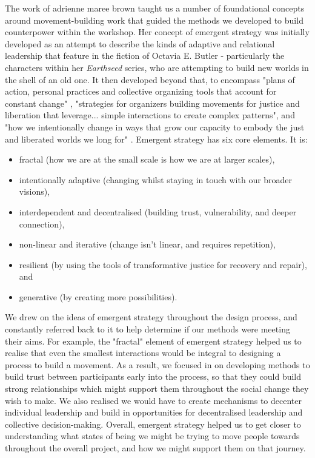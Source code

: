 The work of adrienne maree brown taught us a number of foundational concepts around movement-building work that guided the methods we developed to build counterpower within the workshop. Her concept of emergent strategy was initially developed as an attempt to describe the kinds of adaptive and relational leadership that feature in the fiction of Octavia E. Butler - particularly the characters within her \emph{Earthseed} series, who are attempting to build new worlds in the shell of an old one. It then developed beyond that, to encompass "plans of action, personal practices and collective organizing tools that account for constant change" \citep[p. 23]{brown_emergent_2017}, "strategies for organizers building movements for justice and liberation that leverage... simple interactions to create complex patterns", and "how we intentionally change in ways that grow our capacity to embody the just and liberated worlds we long for" \citep[p. 24]{brown_emergent_2017}. Emergent strategy has six core elements. It is:
\begin{itemize}
    \item fractal (how we are at the small scale is how we are at larger scales),
    \item intentionally adaptive (changing whilst staying in touch with our broader visions),
    \item interdependent and decentralised (building trust, vulnerability, and deeper connection),
    \item non-linear and iterative (change isn't linear, and requires repetition),
    \item resilient (by using the tools of transformative justice for recovery and repair), and
    \item generative (by creating more possibilities). \cite[p. 50]{brown_emergent_2017}
\end{itemize}
We drew on the ideas of emergent strategy throughout the design process, and constantly referred back to it to help determine if our methods were meeting their aims. For example, the "fractal" element of emergent strategy helped us to realise that even the smallest interactions would be integral to designing a process to build a movement. As a result, we focused in on developing methods to build trust between participants early into the process, so that they could build strong relationships which might support them throughout the social change they wish to make. We also realised we would have to create mechanisms to decenter individual leadership and build in opportunities for decentralised leadership and collective decision-making. Overall, emergent strategy helped us to get closer to understanding what states of being we might be trying to move people towards throughout the overall project, and how we might support them on that journey.

